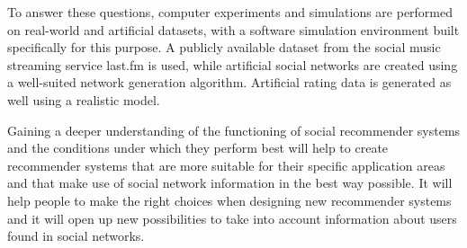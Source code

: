 To answer these questions, computer experiments and simulations are performed on real-world and artificial datasets, with a software simulation environment built specifically for this purpose. A publicly available dataset from the social music streaming service last.fm is used, while artificial social networks are created using a well-suited network generation algorithm. Artificial rating data is generated as well using a realistic model.
\newline

Gaining a deeper understanding of the functioning of social recommender systems and the conditions under which they perform best will help to create recommender systems that are more suitable for their specific application areas and that make use of social network information in the best way possible. It will help people to make the right choices when designing new recommender systems and it will open up new possibilities to take into account information about users found in social networks.